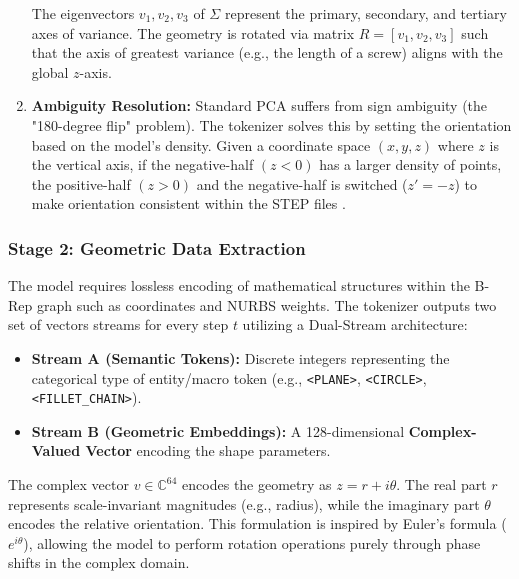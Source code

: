 \begin{indentedblock}{4em}{0pt}
\begin{enumerate}
					The eigenvectors $v_1, v_2, v_3$ of $\Sigma$ represent the primary, secondary, and tertiary axes of variance. The geometry is rotated via matrix $R = [v_1, v_2, v_3]$ such that the axis of greatest variance (e.g., the length of a screw) aligns with the global $z$-axis.
					
					\item \textbf{Ambiguity Resolution:} Standard PCA suffers from sign ambiguity (the "180-degree flip" problem). The tokenizer solves this by setting the orientation based on the model's density. Given a coordinate space $(x, y, z)$ where $z$ is the vertical axis, if the negative-half $(z < 0)$ has a larger density of points, the positive-half $(z > 0)$ and the negative-half is switched ($z' = -z$) to make orientation consistent within the STEP files \parencite{3d_model_retrieval_vranic}.
				\end{enumerate}
			\end{indentedblock}
			
		\subsubsection{Stage 2: Geometric Data Extraction}
			\begin{indentedblock}{4em}{0pt}
				The model requires lossless encoding of mathematical structures within the B-Rep graph such as coordinates and NURBS weights. The tokenizer outputs two set of vectors streams for every step $t$ utilizing a Dual-Stream architecture:
				\begin{itemize}
					\item \textbf{Stream A (Semantic Tokens):} Discrete integers representing the categorical type of entity/macro token (e.g., \texttt{<PLANE>}, \texttt{<CIRCLE>}, \texttt{<FILLET\_CHAIN>}).
					\item \textbf{Stream B (Geometric Embeddings):} A 128-dimensional \textbf{Complex-Valued Vector} encoding the shape parameters.
				\end{itemize}
			\end{indentedblock}
			
			\begin{indentedblock}{4em}{0pt}
				The complex vector $v \in \mathbb{C}^{64}$ encodes the geometry as $z = r + i\theta$. The real part $r$ represents scale-invariant magnitudes (e.g., radius), while the imaginary part $\theta$ encodes the relative orientation. This formulation is inspired by Euler's formula ($e^{i\theta}$), allowing the model to perform rotation operations purely through phase shifts in the complex domain.
			\end{indentedblock}
		
